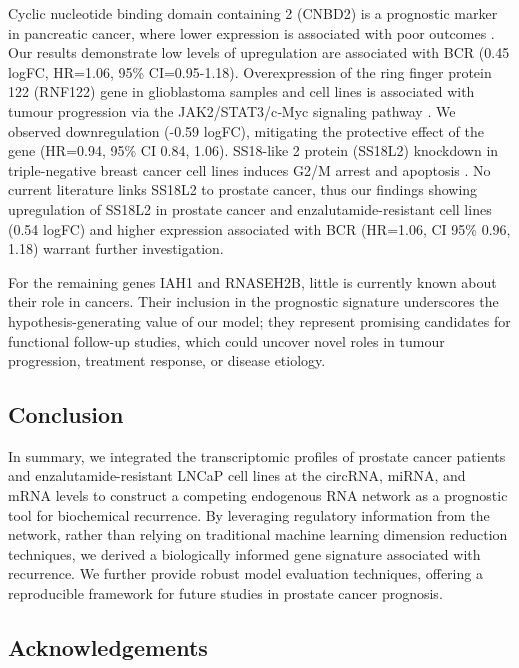 \par 

Cyclic nucleotide binding domain containing 2 (CNBD2) is a prognostic marker in pancreatic cancer, where lower expression is associated with poor outcomes \cite{Uhlen2017Aug}. Our results demonstrate low levels of upregulation are associated with BCR (0.45 logFC, HR=1.06, 95\% CI=0.95-1.18). Overexpression of the ring finger protein 122 (RNF122) gene in glioblastoma samples and cell lines is associated with tumour progression via the  JAK2/STAT3/c‐Myc signaling pathway \cite{Xiao2024Sep}. We observed downregulation (-0.59 logFC), mitigating the protective effect of the gene (HR=0.94, 95\% CI 0.84, 1.06). SS18-like 2 protein (SS18L2) knockdown in triple-negative breast cancer cell lines induces G2/M arrest and apoptosis \cite{Yedier-Bayram2022Aug}. No current literature links SS18L2 to prostate cancer, thus our findings showing upregulation of SS18L2 in prostate cancer and enzalutamide-resistant cell lines (0.54 logFC) and higher expression associated with BCR (HR=1.06, CI 95\% 0.96, 1.18) warrant further investigation.
\par


For the remaining genes IAH1 and RNASEH2B, little is currently known about their role in cancers. Their inclusion in the prognostic signature underscores the hypothesis-generating value of our model; they represent promising candidates for functional follow-up studies, which could uncover novel roles in tumour progression, treatment response, or disease etiology.

\subsection{Conclusion}\label{sec13}
In summary, we integrated the transcriptomic profiles of prostate cancer patients and enzalutamide-resistant LNCaP cell lines at the circRNA, miRNA, and mRNA levels to construct a competing endogenous RNA network as a prognostic tool for biochemical recurrence. By leveraging regulatory information from the network, rather than relying on traditional machine learning dimension reduction techniques, we derived a biologically informed gene signature associated with recurrence. We further provide robust model evaluation techniques, offering a reproducible framework for future studies in prostate cancer prognosis.


\subsection*{Acknowledgements}

